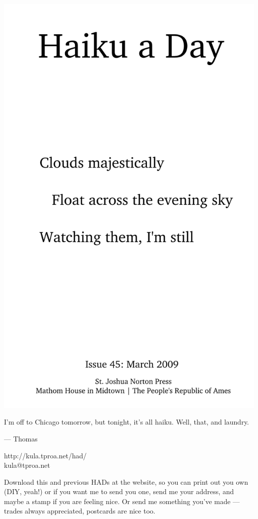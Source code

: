 \documentclass[12pt]{article}
\begin{document}
\includegraphics{frontpage.png}

\newpage

I'm off to Chicago tomorrow, but tonight, it's all haiku.
Well, that, and laundry.

--- Thomas

http://kula.tproa.net/had/ \\
kula@tproa.net

Download this and previous HADs at the website, so you can
print out you own (DIY, yeah!) or if you want me to send
you one, send me your address, and maybe a stamp if you
are feeling nice. Or send me something you've made ---
trades always appreciated, postcards are nice too.
\end{document}
